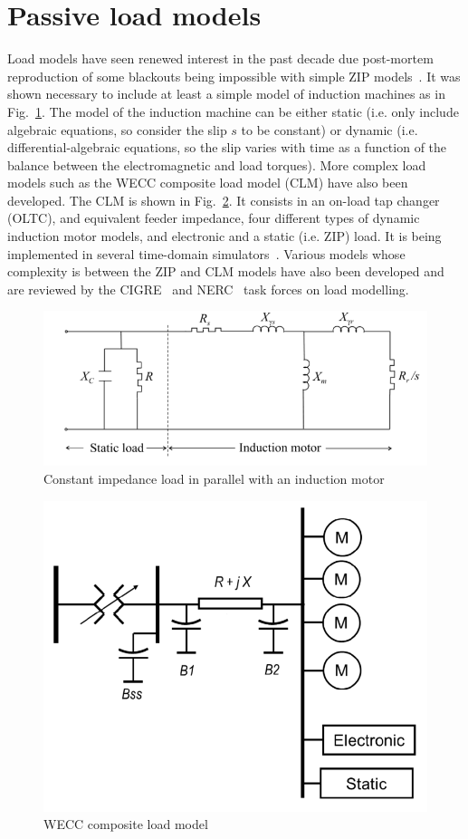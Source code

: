 \section{Passive load models}
\label{sec:dynLoadModel}

Load models have seen renewed interest in the past decade due post-mortem reproduction of some blackouts being impossible with simple ZIP models~\cite[p11-12]{CIGREloadModels}. It was shown necessary to include at least a simple model of induction machines as in Fig.~\ref{fig:motorLoad}. The model of the induction machine can be either static (i.e. only include algebraic equations, so consider the slip \(s\) to be constant) or dynamic (i.e. differential-algebraic equations, so the slip varies with time as a function of the balance between the electromagnetic and load torques). More complex load models such as the WECC composite load model (CLM) have also been developed. The CLM is shown in Fig.~\ref{fig:WECC-CLM}. It consists in an on-load tap changer (OLTC), and equivalent feeder impedance, four different types of dynamic induction motor models, and electronic and a static (i.e. ZIP) load. It is being implemented in several time-domain simulators~\cite{NERCloadModelTF}. Various models whose complexity is between the ZIP and CLM models have also been developed and are reviewed by the CIGRE~\cite{CIGREloadModels} and NERC~\cite{NERCloadModelTF} task forces on load modelling.

\begin{figure}[t]
    \centering
    \includegraphics[width=0.6\linewidth]{Figs/MotorLoad.png}
    \caption{Constant impedance load in parallel with an induction motor~\cite{CIGREloadModels}}
    \label{fig:motorLoad}
\end{figure}

\begin{figure}[t]
    \centering
    \includegraphics[width=0.5\linewidth]{Figs/WECC-composite-load-model.png}
    \caption{WECC composite load model~\cite{NERCloadModelTF}}
    \label{fig:WECC-CLM}
\end{figure}

